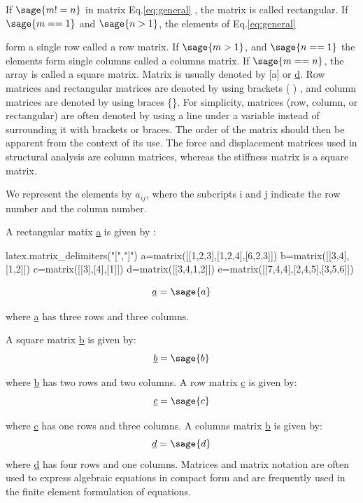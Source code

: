 \documentclass[12pt]{report}
\newcommand{\eref}[1]{
	Eq.\ref{#1}
}
\begin{document}
If $\sage{m!=n}$ in matrix \eref{eq:general},
the matrix is called rectangular. If $\sage{m==1}$ 
and $\sage{n>1}$, the elements of \eref{eq:general}
form a single row called a row matrix. If $\sage{m>1}$,
and $\sage{n==1}$ the elements form single columns called
a columns matrix. If $\sage{m==n}$, the array is called
a square matrix. Matrix is usually denoted by
[a] or \underline{d}. Row matrices and rectangular 
matrices are denoted by using brackets ( ) , and 
column matrices are denoted by using 
braces \{\}. For simplicity, matrices (row, column,
or rectangular) are often denoted by using a line 
under a variable instead of surrounding it with 
brackets or braces. The order of the matrix should 
then be apparent from the context of its 
use. The force and displacement matrices used in 
structural analysis are column matrices, whereas 
the stiffness matrix is a square matrix.

We represent the elements by $a_{{ij}}$,
where the subcripts i and j indicate the
row number and the column number.

A rectangular matix \underline{a} is given by : 
\begin{sagesilent}
	latex.matrix_delimiters("[","]")
	a=matrix([[1,2,3],[1,2,4],[6,2,3]])
	b=matrix([[3,4],[1,2]])
	c=matrix([[3],[4],[1]])
	d=matrix([[3,4,1,2]])
	e=matrix([[7,4,4],[2,4,5],[3,5,6]])
\end{sagesilent}
\begin{equation}
	\underline{a}=\sage{a}
\label{eq:rectangle}
\end{equation}

where \underline{a} has three rows and three columns.

A square matrix \underline{b} is given by:
\begin{equation}
	\underline{b}=\sage{b}
\label{eq:square}
\end{equation}

where \underline{b} has two rows and two
columns. A row matrix \underline{c} is given by:
\begin{equation}
	\underline{c}=\sage{c}
\label{eq:row}
\end{equation}

where \underline{c} has one rows and three
columns. A columns matrix \underline{b} is given by:
\begin{equation}
	\underline{d}=\sage{d}
\label{eq:col}
\end{equation}
where \underline{d} has four rows and one 
columns. Matrices and matrix notation are
often used to express algebraic equations 
in compact form and are frequently used 
in the finite element formulation of equations.
\end{document}
